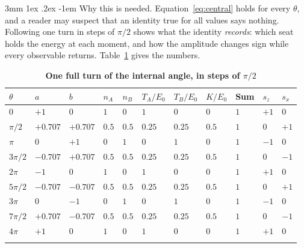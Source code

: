 \documentclass[%
 reprint, amsmath,amssymb, aps, prb, ]{revtex4-2}
\makeatletter
\numberwithin{equation}{section}
\renewcommand\paragraph{%
  \@startsection{paragraph}{4}{\z@}%
    {3mm \@plus 1ex \@minus .2ex}
    {-1em}
    {\normalfont\normalsize\itshape}}
\makeatother
\begin{document}
\paragraph{Why this is needed.} Equation~\eqref{eq:central} holds for every $\theta$, and a reader may suspect that an identity true for all values says nothing. Following one turn in steps of $\pi/2$ shows what the identity \emph{records}: which seat holds the energy at each moment, and how the amplitude changes sign while every observable returns. Table~\ref{tab:trace} gives the numbers.

\begin{table}[t!]
\centering
\caption{\textbf{One full turn of the internal angle, in steps of $\pi/2$}}
\label{tab:trace}
\renewcommand{\arraystretch}{1.3}
\begin{tabular}{p{1.4cm}p{1.15cm}p{1.15cm}p{1.15cm}p{1.15cm}p{1.15cm}p{1.15cm}p{1.15cm}p{1.15cm}p{1.15cm}p{1.15cm}}
\toprule
$\theta$ & $a$ & $b$ & $n_A$ & $n_B$ & $T_A/E_0$ & $T_B/E_0$ & $K/E_0$ & Sum & $s_z$ & $s_x$ \\
\midrule
$0$ & $+1$ & $0$ & $1$ & $0$ & $1$ & $0$ & $0$ & $1$ & $+1$ & $0$ \\
\addlinespace[0.15cm]
$\pi/2$ & $+0.707$ & $+0.707$ & $0.5$ & $0.5$ & $0.25$ & $0.25$ & $0.5$ & $1$ & $0$ & $+1$ \\
\addlinespace[0.15cm]
$\pi$ & $0$ & $+1$ & $0$ & $1$ & $0$ & $1$ & $0$ & $1$ & $-1$ & $0$ \\
\addlinespace[0.15cm]
$3\pi/2$ & $-0.707$ & $+0.707$ & $0.5$ & $0.5$ & $0.25$ & $0.25$ & $0.5$ & $1$ & $0$ & $-1$ \\
\addlinespace[0.15cm]
$2\pi$ & $-1$ & $0$ & $1$ & $0$ & $1$ & $0$ & $0$ & $1$ & $+1$ & $0$ \\
\addlinespace[0.15cm]
$5\pi/2$ & $-0.707$ & $-0.707$ & $0.5$ & $0.5$ & $0.25$ & $0.25$ & $0.5$ & $1$ & $0$ & $+1$ \\
\addlinespace[0.15cm]
$3\pi$ & $0$ & $-1$ & $0$ & $1$ & $0$ & $1$ & $0$ & $1$ & $-1$ & $0$ \\
\addlinespace[0.15cm]
$7\pi/2$ & $+0.707$ & $-0.707$ & $0.5$ & $0.5$ & $0.25$ & $0.25$ & $0.5$ & $1$ & $0$ & $-1$ \\
\addlinespace[0.15cm]
$4\pi$ & $+1$ & $0$ & $1$ & $0$ & $1$ & $0$ & $0$ & $1$ & $+1$ & $0$ \\
\addlinespace[0.2cm]
\bottomrule
\end{tabular}

\end{table}
\end{document}
